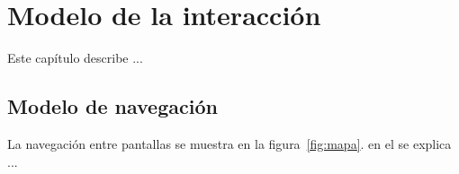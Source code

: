 \chapter{Modelo de la interacción}	
\label{cap:modInteraccion}

Este capítulo describe ...

\section{Modelo de navegación}

La navegación entre pantallas se muestra en la figura~\ref{fig:mapa}. en el se explica ...\\


\newpage

\newpage


\newpage


\newpage


\newpage


\newpage


\newpage

%


\newpage


\newpage



\newpage


\newpage


\newpage

%


\newpage


\newpage


\newpage

%

\newpage


\newpage


\newpage


\newpage


\newpage


\newpage

